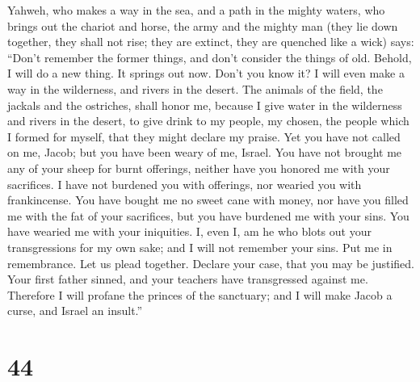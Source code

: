  Yahweh, who makes a way in the sea, and a path in the
mighty waters,  who brings out the chariot and horse, the
army and the mighty man (they lie down together, they shall not rise;
they are extinct, they are quenched like a wick) says: 
``Don't remember the former things, and don't consider the things of
old.  Behold, I will do a new thing. It springs out now.
Don't you know it? I will even make a way in the wilderness, and rivers
in the desert.  The animals of the field, the jackals and
the ostriches, shall honor me, because I give water in the wilderness
and rivers in the desert, to give drink to my people, my chosen,
 the people which I formed for myself, that they might
declare my praise.  Yet you have not called on me, Jacob;
but you have been weary of me, Israel.  You have not
brought me any of your sheep for burnt offerings, neither have you
honored me with your sacrifices. I have not burdened you with offerings,
nor wearied you with frankincense.  You have bought me no
sweet cane with money, nor have you filled me with the fat of your
sacrifices, but you have burdened me with your sins. You have wearied me
with your iniquities.  I, even I, am he who blots out your
transgressions for my own sake; and I will not remember your sins.
 Put me in remembrance. Let us plead together. Declare your
case, that you may be justified.  Your first father sinned,
and your teachers have transgressed against me.  Therefore
I will profane the princes of the sanctuary; and I will make Jacob a
curse, and Israel an insult.''

\hypertarget{section-42}{%
\section{44}\label{section-42}}

